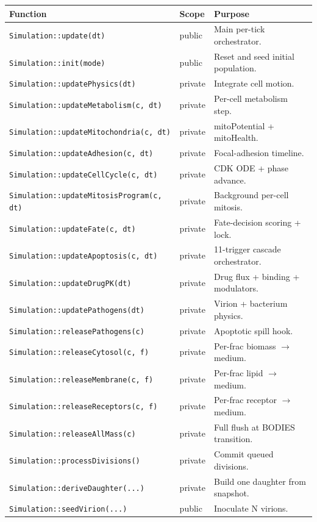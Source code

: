 \documentclass[11pt,letterpaper,twoside,openany]{book}
\newcommand{\code}[1]{\texttt{#1}}
\begin{document}
\begin{longtable}{p{5.2cm}p{2.0cm}p{7.0cm}}
\toprule
\textbf{Function} & \textbf{Scope} & \textbf{Purpose}\\ \midrule
\code{Simulation::update(dt)} & public & Main per-tick orchestrator.\\
\code{Simulation::init(mode)} & public & Reset and seed initial population.\\
\code{Simulation::updatePhysics(dt)} & private & Integrate cell motion.\\
\code{Simulation::updateMetabolism(c, dt)} & private & Per-cell metabolism step.\\
\code{Simulation::updateMitochondria(c, dt)} & private & mitoPotential + mitoHealth.\\
\code{Simulation::updateAdhesion(c, dt)} & private & Focal-adhesion timeline.\\
\code{Simulation::updateCellCycle(c, dt)} & private & CDK ODE + phase advance.\\
\code{Simulation::updateMitosisProgram(c, dt)} & private & Background per-cell mitosis.\\
\code{Simulation::updateFate(c, dt)} & private & Fate-decision scoring + lock.\\
\code{Simulation::updateApoptosis(c, dt)} & private & 11-trigger cascade orchestrator.\\
\code{Simulation::updateDrugPK(dt)} & private & Drug flux + binding + modulators.\\
\code{Simulation::updatePathogens(dt)} & private & Virion + bacterium physics.\\
\code{Simulation::releasePathogens(c)} & private & Apoptotic spill hook.\\
\code{Simulation::releaseCytosol(c, f)} & private & Per-frac biomass $\to$ medium.\\
\code{Simulation::releaseMembrane(c, f)} & private & Per-frac lipid $\to$ medium.\\
\code{Simulation::releaseReceptors(c, f)} & private & Per-frac receptor $\to$ medium.\\
\code{Simulation::releaseAllMass(c)} & private & Full flush at BODIES transition.\\
\code{Simulation::processDivisions()} & private & Commit queued divisions.\\
\code{Simulation::deriveDaughter(...)} & private & Build one daughter from snapshot.\\
\code{Simulation::seedVirion(...)} & public & Inoculate N virions.\\

\end{longtable}
\end{document}
